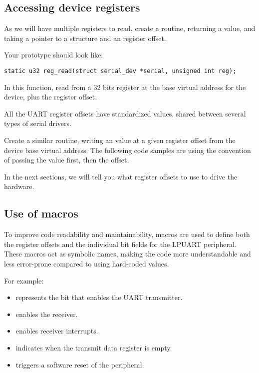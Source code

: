 \subsection{Accessing device registers}

As we will have multiple registers to read, create a 
routine, returning a  value, and taking a 
pointer to a  structure and an 
register offset.

Your prototype should look like:
\begin{verbatim}
static u32 reg_read(struct serial_dev *serial, unsigned int reg);
\end{verbatim}

In this function, read from a 32 bits register at the base virtual
address for the device, plus the register offset.

All the UART register offsets have standardized values, shared between
several types of serial drivers.

Create a similar  routine, writing an 
value at a given register offset from the device base virtual address.
The following code samples are using
the  convention of passing the value first, then the
offset.

In the next sections, we will tell you what register offsets to use
to drive the hardware.


\subsection{Use of macros}

To improve code readability and maintainability, macros are used to define both the register offsets and the individual bit fields for the LPUART peripheral. These macros act as symbolic names, making the code more understandable and less error-prone compared to using hard-coded values.

For example:
\begin{itemize}
  \item {} represents the bit that enables the UART transmitter.
  \item {} enables the receiver.
  \item {} enables receiver interrupts.
  \item {} indicates when the transmit data register is empty.
  \item {} triggers a software reset of the peripheral.
\end{itemize}

